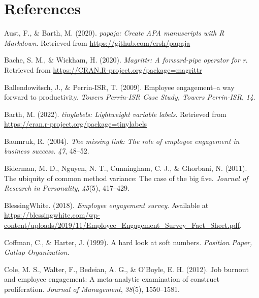 \documentclass[
  man]{apa7}
\newlength{\cslhangindent}
\newlength{\cslentryspacingunit} %
\newenvironment{CSLReferences}[2] %
 {%
  \setlength{\parindent}{0pt}
  \ifodd #1
  \let\oldpar\par
  \def\par{\hangindent=\cslhangindent\oldpar}
  \fi
  \setlength{\parskip}{#2\cslentryspacingunit}
 }%
 {}
\begin{document}
\newpage

\hypertarget{references}{%
\section{References}\label{references}}

\begingroup
\setlength{\parindent}{-0.5in}
\setlength{\leftskip}{0.5in}

\hypertarget{refs}{}
\begin{CSLReferences}{1}{0}
\leavevmode{}%
Aust, F., \& Barth, M. (2020). \emph{{papaja}: {Create} {APA} manuscripts with {R Markdown}}. Retrieved from \url{https://github.com/crsh/papaja}

\leavevmode{}%
Bache, S. M., \& Wickham, H. (2020). \emph{Magrittr: A forward-pipe operator for r}. Retrieved from \url{https://CRAN.R-project.org/package=magrittr}

\leavevmode{}%
Ballendowitsch, J., \& Perrin-ISR, T. (2009). Employee engagement--a way forward to productivity. \emph{Towers Perrin-ISR Case Study, Towers Perrin-ISR}, \emph{14}.

\leavevmode{}%
Barth, M. (2022). \emph{{tinylabels}: Lightweight variable labels}. Retrieved from \url{https://cran.r-project.org/package=tinylabels}

\leavevmode{}%
Baumruk, R. (2004). \emph{The missing link: The role of employee engagement in business success}. \emph{47}, 48--52.

\leavevmode{}%
Biderman, M. D., Nguyen, N. T., Cunningham, C. J., \& Ghorbani, N. (2011). The ubiquity of common method variance: The case of the big five. \emph{Journal of Research in Personality}, \emph{45}(5), 417--429.

\leavevmode{}%
BlessingWhite. (2018). \emph{Employee engagement survey}. Available at \url{https://blessingwhite.com/wp-content/uploads/2019/11/Employee_Engagement_Survey_Fact_Sheet.pdf}.

\leavevmode{}%
Coffman, C., \& Harter, J. (1999). A hard look at soft numbers. \emph{Position Paper, Gallup Organization}.

\leavevmode{}%
Cole, M. S., Walter, F., Bedeian, A. G., \& O'Boyle, E. H. (2012). Job burnout and employee engagement: A meta-analytic examination of construct proliferation. \emph{Journal of Management}, \emph{38}(5), 1550--1581.


\end{CSLReferences}
\end{document}
